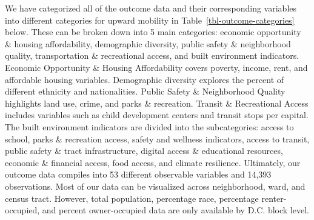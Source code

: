 \documentclass[
  letterpaper,
  DIV=11,
  numbers=noendperiod]{scrartcl}
\begin{document}
We have categorized all of the outcome data and their corresponding
variables into different categories for upward mobility in
Table~\ref{tbl-outcome-categories} below. These can be broken down into
5 main categories: economic opportunity \& housing affordability,
demographic diversity, public safety \& neighborhood quality,
transportation \& recreational access, and built environment indicators.
Economic Opportunity \& Housing Affordability covers poverty, income,
rent, and affordable housing variables. Demographic diversity explores
the percent of different ethnicity and nationalities. Public Safety \&
Neighborhood Quality highlights land use, crime, and parks \&
recreation. Transit \& Recreational Access includes variables such as
child development centers and transit stops per capital. The built
environment indicators are divided into the subcategories: access to
school, parks \& recreation access, safety and wellness indicators,
access to transit, public safety \& tract infrastructure, digital access
\& educational resources, economic \& financial access, food access, and
climate resilience. Ultimately, our outcome data compiles into 53
different observable variables and 14,393 observations. Most of our data
can be visualized across neighborhood, ward, and census tract. However,
total population, percentage race, percentage renter-occupied, and
percent owner-occupied data are only available by D.C. block level.
\end{document}
